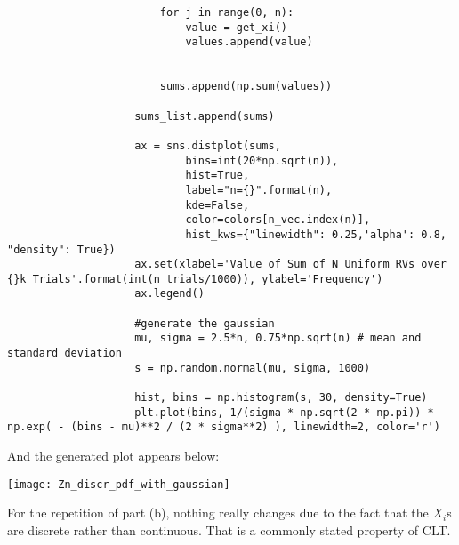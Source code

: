 \documentclass[]{article}
\begin{document}
\begin{enumerate}
\begin{enumerate}
\begin{lstlisting}
						for j in range(0, n):
							value = get_xi()
							values.append(value)
				
				
						sums.append(np.sum(values))
				
					sums_list.append(sums)
				
					ax = sns.distplot(sums,
							bins=int(20*np.sqrt(n)),
							hist=True,
							label="n={}".format(n),
							kde=False,
							color=colors[n_vec.index(n)],
							hist_kws={"linewidth": 0.25,'alpha': 0.8, "density": True})
					ax.set(xlabel='Value of Sum of N Uniform RVs over {}k Trials'.format(int(n_trials/1000)), ylabel='Frequency')
					ax.legend()
				
					#generate the gaussian
					mu, sigma = 2.5*n, 0.75*np.sqrt(n) # mean and standard deviation
					s = np.random.normal(mu, sigma, 1000)
				
					hist, bins = np.histogram(s, 30, density=True)
					plt.plot(bins, 1/(sigma * np.sqrt(2 * np.pi)) * np.exp( - (bins - mu)**2 / (2 * sigma**2) ), linewidth=2, color='r')
			\end{lstlisting}
		
			And the generated plot appears below:
			
			\texttt{[image: Zn\_discr\_pdf\_with\_gaussian]}
			
			For the repetition of part (b), nothing really changes due to the fact that the $X_i$s are discrete rather than continuous. That is a commonly stated property of CLT.

			
		\end{enumerate}

\end{enumerate}
\end{document}
